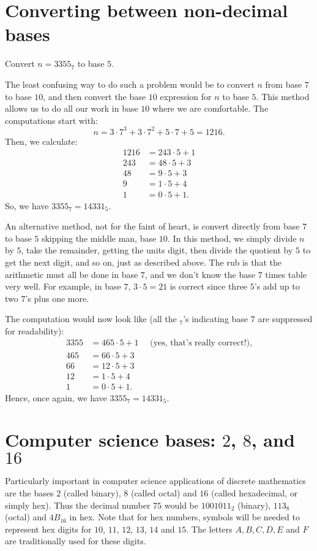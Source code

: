 \section{Converting between non-decimal bases}
\begin{exmp}
Convert $n=3355_7$ to base $5$.

The least confusing way to do such a problem would be to convert $n$ from base $7$ to base $10$,
and then convert the base $10$ expression for $n$ to base $5$. This method allows us to do
all our work in base $10$ where we are comfortable. The computations start with:
\[
n = 3\cdot7^3+3\cdot7^2+5\cdot7+5 = 1216.
\]
Then, we calculate: 
\begin{align*}
 1216 & =243\cdot 5 + 1 \\
 243 &= 48\cdot 5 + 3 \\
 48  & = 9\cdot 5 + 3  \\
 9 &= 1\cdot 5 +4 \\
 1 & = 0\cdot 5 + 1.
\end{align*}
So, we have $3355_7=14331_5$.
\end{exmp}

An alternative method, not for the faint of heart, is convert directly from base $7$ to
base $5$ skipping the middle man, base $10$. In this method, we simply divide
$n$ by $5$, take the remainder, getting the units digit, then divide the quotient by
$5$ to get the next digit, and so on, just as described above. The rub is that the arithmetic
must all be done in base $7$, and we don't know the base $7$ times table very well.
For example, in base $7$, $3\cdot 5 = 21$ is correct since three $5$'s add up to two $7$'s
plus one more.

The computation would now look like (all the $_7$'s indicating base $7$ are suppressed
for readability):
\begin{align*}
 3355 &= 465\cdot5+ 1 \quad\text{ (yes, that's really correct!),} \\
 465  &= 66\cdot 5 + 3 \\
 66  & =12\cdot 5 + 3  \\
 12 &= 1\cdot 5 +4 \\
 1 & = 0\cdot 5 + 1.
\end{align*}
Hence, once again, we have  $3355_7=14331_5$.



\section{Computer science bases: $2$, $8$, and $16$}
Particularly important in computer science applications of
discrete mathematics are the bases $2$ (called binary), $8$ (called octal)
and $16$ (called hexadecimal, or simply hex). Thus the decimal number
$75$ would be $1001011_2$ (binary), $113_8$ (octal) and $4B_{16}$ in
hex. Note that for hex numbers, symbols will be needed to represent hex
digits for $10$, $11$, $12$, $13$, $14$ and $15$.  The letters
$A,B,C,D,E$ and $F$ are traditionally used for these digits.

